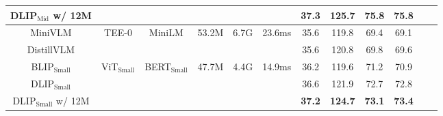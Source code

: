 \documentclass[10pt,twocolumn,letterpaper]{article}
\begin{document}
\begin{table}[h]
\begin{small}
\begin{center}
\begin{tabular}{c|ccccccccccc}
        DLIP$_{\text{Mid}}$ w/ 12M   &  &  &  &  &  & \textbf{37.3} & \textbf{125.7}  & \textbf{75.8} & \textbf{75.8} \\
        \midrule
        MiniVLM \cite{wang2020minivlm}  &  \multirow{2}{1.5cm}{ \centering TEE-0} &  \multirow{2}{1.5cm}{ \centering  MiniLM} &  \multirow{2}{1.5cm}{ \centering 53.2M} &  \multirow{2}{1.5cm}{ \centering 6.7G} &  \multirow{2}{1.5cm}{ \centering 23.6ms} & 35.6 & 119.8 & 69.4 & 69.1  \\
        DistillVLM \cite{fang2021compressing}      &  &  &  &  &  & 35.6 & 120.8 & 69.8 & 69.6 \\
        \midrule
        BLIP$_{\text{Small}}$  &  \multirow{3}{1.5cm}{ \centering  ViT$_{\text{Small}}$} &  \multirow{3}{1.5cm}{ \centering  BERT$_{\text{Small}}$} &  \multirow{3}{1.5cm}{ \centering 47.7M} &  \multirow{3}{1.5cm}{ \centering 4.4G}  &  \multirow{3}{1.5cm}{ \centering 14.9ms} & 36.2 & 119.6 & 71.2 & 70.9 \\
        DLIP$_{\text{Small}}$                 &  &  &  &  &  & 36.6 & 121.9 & 72.7 & 72.8 \\
        DLIP$_{\text{Small}}$ w/ 12M               & & &  &  &  & \textbf{37.2} & \textbf{124.7} & \textbf{73.1} & \textbf{73.4} \\
        \bottomrule 
    \end{tabular}
    \end{center}
     \end{small}
    \vskip -0.1in
  \end{table}
\end{document}
